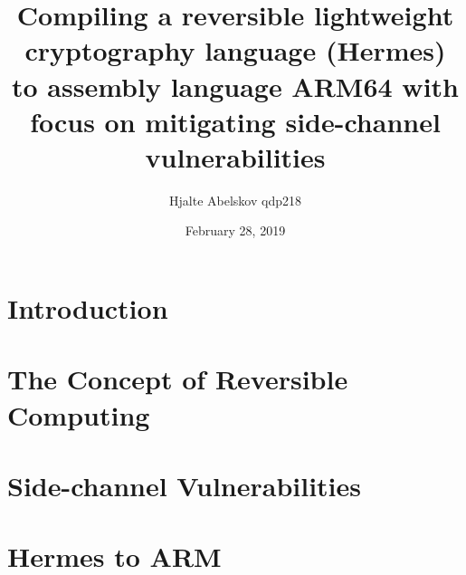 \documentclass[a4paper,10pt,openright]{memoir}
\title{Compiling a reversible lightweight cryptography language (Hermes) to assembly language ARM64 with focus on mitigating side-channel vulnerabilities}
\author{Hjalte Abelskov qdp218}
\date{February 28, 2019} %
\begin{document}
\maketitle
{}
\setcounter{page}{3}

\cleardoublepage
\pagestyle{plain}
\begin{abstract}

\end{abstract}

\clearpage
\begin{resume}

\end{resume}

\setcounter{tocdepth}{2} %
\cleardoublepage
{}
\tableofcontents*

\cleardoublepage
{}
\setcounter{page}{1}

\chapter{Introduction}




\chapter{The Concept of Reversible Computing}
\label{chapt - Concept of reversible computing}



%

\chapter{Side-channel Vulnerabilities}
\label{chapt - Side-channel}


\chapter{Hermes to ARM}


\end{document}
